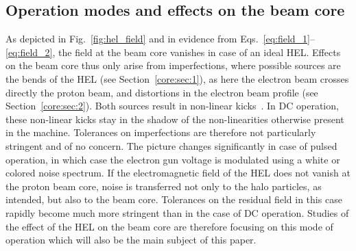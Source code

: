 \documentclass[%
 reprint,
 amsmath,amssymb,
 aps,
prstab,
]{revtex4-1}
\begin{document}
\subsection{Operation modes and effects on the beam core\label{sec:hel:core}}
As depicted in Fig.~\ref{fig:hel_field} and in evidence from Eqs.~\ref{eq:field_1}--\ref{eq:field_2}, the field at the beam core vanishes in case of an ideal HEL. Effects on the beam core thus only arise from imperfections, where possible sources are the bends of the HEL (see Section~\ref{core:sec:1}), as here the electron beam crosses directly the proton beam, and distortions in the electron beam profile (see Section~\ref{core:sec:2}). Both sources result in non-linear kicks~\cite{hel_bends_stancari,hel_model_polynomial_morozov}. In DC operation, these non-linear kicks stay in the shadow of the non-linearities otherwise present in the machine. Tolerances on imperfections are therefore not particularly stringent and of no concern. The picture changes significantly in case of pulsed operation, in which case the electron gun voltage is modulated using a white or colored noise spectrum. If the electromagnetic field of the HEL does not vanish at the proton beam core, noise is transferred not only to the halo particles, as intended, but also to the beam core. Tolerances on the residual field in this case rapidly become much more stringent than in the case of DC operation. Studies of the effect of the HEL on the beam core are therefore focusing on this mode of operation which will also be the main subject of this paper.
\end{document}
